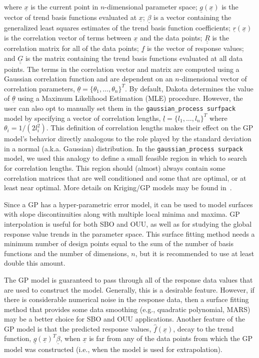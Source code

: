 where $\underline{x}$ is the current point in $n$-dimensional parameter
space; $\underline{g}(\underline{x})$ is the vector of trend basis 
functions evaluated at $\underline{x}$; $\underline{\beta}$ is a vector
containing the generalized least squares estimates of the trend basis 
function coefficients; $\underline{r}(\underline{x})$ is the correlation 
vector of terms between $\underline{x}$ and the data points;
$\underline{\underline{R}}$ is the correlation matrix for all of the 
data points; $\underline{f}$ is the vector of response values; and 
$\underline{\underline{G}}$ is the matrix containing the trend basis 
functions evaluated at all data points.  The terms in the correlation 
vector and matrix are computed using a Gaussian correlation function 
and are dependent on an $n$-dimensional vector of correlation parameters,
$\underline{\theta} = \{\theta_{1},\ldots,\theta_{n}\}^T$. By default, 
Dakota determines the value of $\underline{\theta}$ using a Maximum
Likelihood Estimation (MLE) procedure.  However, the user can also opt 
to manually set them in the \texttt{gaussian\_process surfpack}
model by specifying a vector of correlation lengths, 
$\underline{l}=\{l_{1},\ldots,l_{n}\}^T$ where 
$\theta_i=1/(2 l_i^2)$. This definition of correlation lengths makes 
their effect on the GP model's behavior directly analogous to the 
role played by the standard deviation in a normal (a.k.a. Gaussian) 
distribution.  In the \texttt{gaussian\_process surpack} model, we used 
this analogy to define a small feasible region in which to search for 
correlation lengths.  This region should (almost) always contain some 
correlation matrices that are well conditioned and some that are optimal, 
or at least near optimal. More details on Kriging/GP models may be 
found in~\cite{Giu98}.

Since a GP has a hyper-parametric error model, it can be used 
to model surfaces with slope discontinuities along with multiple 
local minima and maxima. GP interpolation is useful for both 
SBO and OUU, as well as for studying the global response value trends 
in the parameter space. This surface fitting method needs a 
minimum number of design points equal to the sum of the number of 
basis functions and the number of dimensions, $n$, but it is 
recommended to use at least double this amount.

The GP model is guaranteed to pass through all of the response 
data values that are used to construct the model. Generally, this is a
desirable feature. However, if there is considerable numerical noise
in the response data, then a surface fitting method that provides some
data smoothing (e.g., quadratic polynomial, MARS) may be a better
choice for SBO and OUU applications. Another feature of the GP
model is that the predicted response values, $\hat{f}(\underline{x})$,
decay to the trend function, 
$\underline{g}(\underline{x})^T\underline{\beta}$, when $\underline{x}$ 
is far from any of the data points from which the GP model was 
constructed (i.e., when the model is used for extrapolation). 

